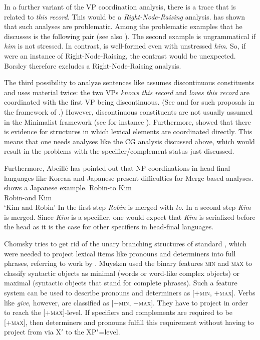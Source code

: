 In a further variant of the VP coordination analysis, there is a trace that is related to 
\emph{this record}. This would be a \emph{Right-Node-Raising} analysis. \citet{Borsley2005a} has shown
that such analyses are problematic. Among the problematic examples that he discusses is the
following pair  (see also \citealp[]{Bresnan74a-u}).
\eal
{}
\zl
The second example is ungrammatical if \emph{him} is not stressed. In contrast,  is
well-formed even with unstressed \emph{him}. So, if  were an instance of
Right-Node-Raising, the contrast would be unexpected. Borsley therefore excludes a
Right-Node-Raising analysis.


The third possibility to analyze sentences like  assumes
discontinuous constituents and uses material twice: the two VPs \emph{knows this record} and \emph{loves this record} are coordinated with the first VP being
discontinuous. (See  and  for such proposals in the framework of \hpsg.)
However, discontinuous constituents are not usually assumed in the Minimalist framework (see for
instance ). Furthermore, \citet{Abeille2006a} showed that there is evidence for structures in
which lexical elements are coordinated directly. This means that one needs analyses like the CG
analysis discussed above, which would result in the problems with the specifier/complement
status just discussed. 

Furthermore, Abeillé has pointed out that NP coordinations in head-final languages like Korean and
Japanese present difficulties for Merge-based analyses.  shows a Japanese example.
\ea
\label{coordination-head-final}
\gll Robin-to Kim\\
     Robin-and Kim\\
\glt `Kim and Robin'
\z
In the first step \emph{Robin} is merged with \emph{to}. In a second step \emph{Kim} is
merged. Since \emph{Kim} is a specifier, one would expect that \emph{Kim} is serialized before the
head as it is the case for other specifiers in head-final languages.

Chomsky tries to get rid of the unary branching structures of standard \xbart, which were needed to
project lexical items like pronouns and determiners into full phrases, referring to work by
\citet{Muysken82a}. Muysken used the binary features \textsc{min} and \textsc{max} to classify syntactic
objects as minimal (words or word-like complex objects) or maximal (syntactic objects that stand for
complete phrases). Such a feature system can be used to describe pronouns and determiners as
[+\textsc{min}, $+$\textsc{max}]. Verbs like \emph{give}, however, are classified as [+\textsc{min},
  $-$\textsc{max}]. They have to project in order to reach the [+\textsc{max}]-level. If specifiers
and complements are required to be [+\textsc{max}], then determiners and pronouns fulfill this requirement
without having to project from \xzero via X$'$ to the XP"=level.

